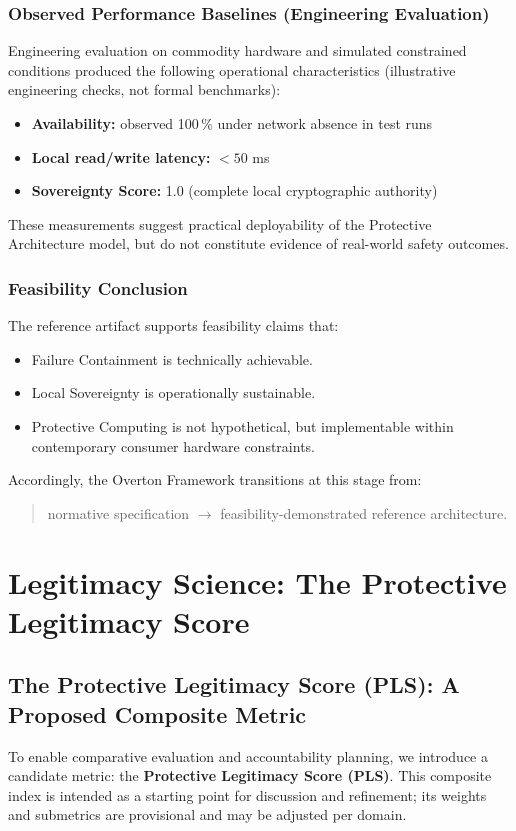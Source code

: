 \documentclass[12pt]{article}
\begin{document}
\subsubsection{Observed Performance Baselines (Engineering Evaluation)}
Engineering evaluation on commodity hardware and simulated constrained conditions produced the following operational characteristics (illustrative engineering checks, not formal benchmarks):
\begin{itemize}
\item \textbf{Availability:} observed 100\,\% under network absence in test runs
\item \textbf{Local read/write latency:} $< 50$ ms
\item \textbf{Sovereignty Score:} 1.0 (complete local cryptographic authority)
\end{itemize}

These measurements suggest practical deployability of the Protective Architecture model, but do not constitute evidence of real-world safety outcomes.

\subsubsection{Feasibility Conclusion}
The reference artifact supports feasibility claims that:
\begin{itemize}
\item Failure Containment is technically achievable.
\item Local Sovereignty is operationally sustainable.
\item Protective Computing is not hypothetical, but implementable within contemporary consumer hardware constraints.
\end{itemize}
Accordingly, the Overton Framework transitions at this stage from:
\begin{quote}
normative specification $\rightarrow$ feasibility-demonstrated reference architecture.
\end{quote}

\section{Legitimacy Science: The Protective Legitimacy Score}

\subsection{The Protective Legitimacy Score (PLS): A Proposed Composite Metric}
To enable comparative evaluation and accountability planning, we introduce a candidate metric: the \textbf{Protective Legitimacy Score (PLS)}. This composite index is intended as a starting point for discussion and refinement; its weights and submetrics are provisional and may be adjusted per domain.
\end{document}
